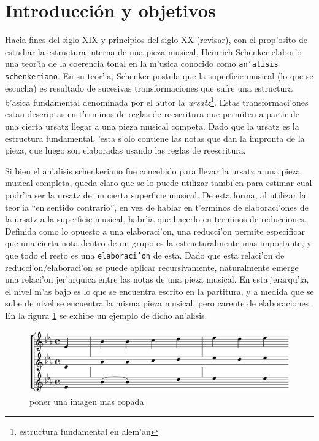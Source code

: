 \section{Introducci\'on y objetivos}
Hacia fines del siglo XIX y principios del siglo XX (\alert{revisar}), con el prop'osito de estudiar la estructura interna de una pieza musical, 
Heinrich Schenker elabor'o una teor'ia de la coerencia tonal en la m'usica conocido como \texttt{an'alisis schenkeriano}.
En su teor'ia, Schenker postula que la superficie musical (lo que se escucha) es resultado de sucesivas transformaciones que sufre una estructura b'asica fundamental 
denominada por el autor la \emph{ursatz}\footnote{estructura fundamental en alem'an}. Estas transformaci'ones estan descriptas en t'erminos de reglas de reescritura que permiten 
a partir de una cierta ursatz llegar a una pieza musical competa. Dado que la ursatz es la estructura fundamental, 'esta s'olo contiene las notas que dan la impronta de la pieza, 
que luego son elaboradas usando las reglas de reescritura.

Si bien el an'alisis schenkeriano fue concebido para llevar la ursatz a una pieza musical completa, queda claro que se lo puede utilizar tambi'en para estimar
cual podr'ia ser la ursatz de un cierta superficie musical. De esta forma, al utilizar la teor'ia ``en sentido contrario'', en vez de hablar en t'erminos de elaboraci'ones de 
la ursatz a la superficie musical, habr'ia que hacerlo en terminos de reducciones. Definida como lo opuesto a una elaboraci'on, una reducci'on permite especificar que una cierta 
nota dentro de un grupo es la estructuralmente mas importante, y que todo el resto es una \texttt{elaboraci'on} de esta. 
Dado que esta relaci'on de reducci'on/elaboraci'on se puede aplicar recursivamente, naturalmente emerge una relaci'on 
jer'arquica entre las notas de una pieza musical.  En esta jerarqu'ia, el nivel m'as bajo es lo que se encuentra escrito en la partitura, y a medida que se sube de nivel se 
encuentra la misma pieza musical, pero carente de elaboraciones. En la figura \ref{fig_analisis_schenkeriano} se exhibe un ejemplo de dicho an'alisis.


\begin{figure}[h]
\begin{center}
\includegraphics[width=12cm]{images/schenkerian_example.eps}
\label{fig_analisis_schenkeriano}
\newline \alert{poner una imagen mas copada}
\end{center}
\end{figure}

